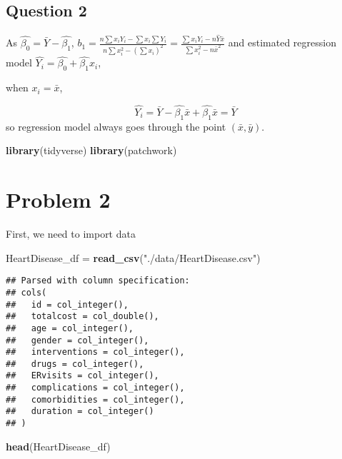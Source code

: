\documentclass[]{article}
\newenvironment{Shaded}{\begin{snugshade}}{\end{snugshade}}
\newcommand{\KeywordTok}[1]{\textcolor[rgb]{0.13,0.29,0.53}{\textbf{#1}}}
\newcommand{\StringTok}[1]{\textcolor[rgb]{0.31,0.60,0.02}{#1}}
\newcommand{\NormalTok}[1]{#1}
\begin{document}
\subsection{Question 2}\label{question-2}

As \(\hat{\beta_0}=\bar{Y}-\hat{\beta_1}\),
\(b_1 = \frac{n\sum x_iY_i-\sum x_i\sum Y_i}{n\sum x^2_i-(\sum x_i)^2} = \frac{\sum x_iY_i-n\hat{Y}\bar{x}}{\sum x_i^2 - n\bar{x}^2}\)
and estimated regression model
\(\hat{Y_i}=\hat{\beta_0}+\hat{\beta_1}x_i\),

when \(x_i=\bar{x}\),

\[\hat{Y_i}=\bar{Y}-\hat{\beta_1}\bar{x}+\hat{\beta_1}\bar{x}=\bar{Y}\]
so regression model always goes through the point \((\bar{x},\bar{y})\).

\begin{Shaded}
\begin{Highlighting}[]
\KeywordTok{library}\NormalTok{(tidyverse)}
\KeywordTok{library}\NormalTok{(patchwork)}
\end{Highlighting}
\end{Shaded}

\section{Problem 2}\label{problem-2}

First, we need to import data

\begin{Shaded}
\begin{Highlighting}[]
\NormalTok{HeartDisease_df =}\StringTok{ }\KeywordTok{read_csv}\NormalTok{(}\StringTok{"./data/HeartDisease.csv"}\NormalTok{) }
\end{Highlighting}
\end{Shaded}

\begin{verbatim}
## Parsed with column specification:
## cols(
##   id = col_integer(),
##   totalcost = col_double(),
##   age = col_integer(),
##   gender = col_integer(),
##   interventions = col_integer(),
##   drugs = col_integer(),
##   ERvisits = col_integer(),
##   complications = col_integer(),
##   comorbidities = col_integer(),
##   duration = col_integer()
## )
\end{verbatim}

\begin{Shaded}
\begin{Highlighting}[]
\KeywordTok{head}\NormalTok{(HeartDisease_df)}
\end{Highlighting}
\end{Shaded}
\end{document}
